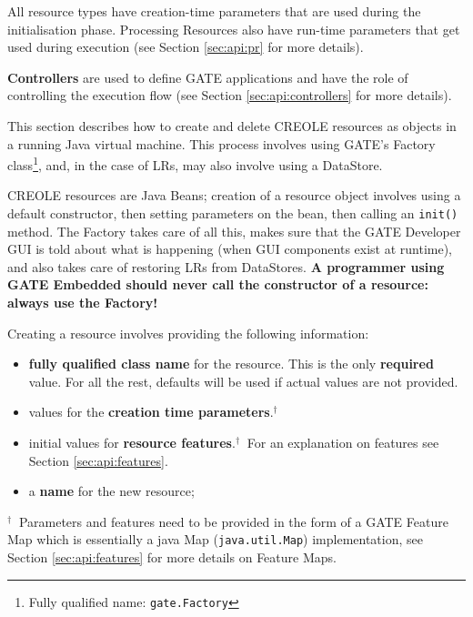 All resource types have creation-time parameters that are used during the
initialisation phase. Processing Resources also have run-time parameters
that get used during execution (see Section \ref{sec:api:pr} for more
details).

\textbf{Controllers} are used to define GATE applications and have the role of
controlling the execution flow (see Section \ref{sec:api:controllers} for
more details).

This section describes how to create and delete CREOLE resources as
objects in a running Java virtual machine. This process involves using
GATE's Factory class\footnote{Fully qualified
name: \tt{gate.Factory}}, and, in the case of LRs, may also involve
using a DataStore.

CREOLE resources are Java Beans; creation of a resource object
involves using a default constructor, then setting parameters on the
bean, then calling an {\tt init()} method. The Factory takes care of
all this, makes sure that the GATE Developer GUI is told about what is
happening (when GUI components exist at runtime), and also takes care
of restoring LRs from DataStores. \textbf{A programmer using GATE
Embedded should never call the constructor of a resource: always use
the Factory!}

Creating a resource involves providing the following information:
\begin{itemize}
\item \textbf{fully qualified class name} for the resource. This is the only
{\bf required} value. For all the rest, defaults will be used if actual values
are not provided.
\item values for the \textbf{creation time parameters}.$^\dagger\ $
\item initial values for \textbf{resource features}.$^\dagger\ $ For an
explanation on features see Section \ref{sec:api:features}.
\item a \textbf{name} for the new resource;
\end{itemize}

$^\dagger\ $ Parameters and features need to be provided in the form of a
GATE Feature Map which is essentially a java Map ({\tt java.util.Map})
implementation, see Section \ref{sec:api:features} for more details
on Feature Maps.

%
%
%
%



